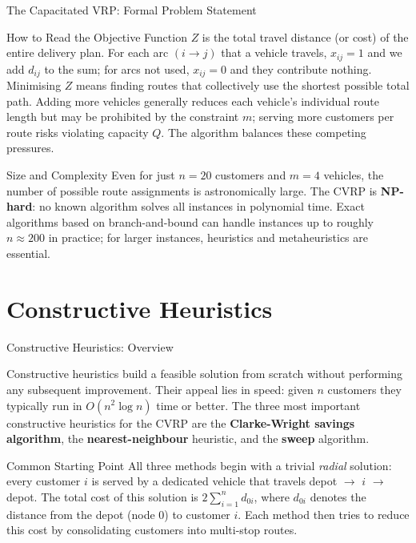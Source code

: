 \documentclass[aspectratio=169,10pt]{beamer}
\begin{document}
\begin{frame}[allowframebreaks]{The Capacitated VRP: Formal Problem Statement}
  \begin{alertblock}{How to Read the Objective Function}
    $Z$ is the total travel distance (or cost) of the entire delivery
    plan.  For each arc $(i \to j)$ that a vehicle travels, $x_{ij} = 1$
    and we add $d_{ij}$ to the sum; for arcs not used, $x_{ij} = 0$ and
    they contribute nothing.  Minimising $Z$ means finding routes that
    collectively use the shortest possible total path.  Adding more
    vehicles generally reduces each vehicle's individual route length but
    may be prohibited by the constraint $m$; serving more customers per
    route risks violating capacity $Q$.  The algorithm balances these
    competing pressures.
  \end{alertblock}

  \begin{exampleblock}{Size and Complexity}
    Even for just $n = 20$ customers and $m = 4$ vehicles, the number of
    possible route assignments is astronomically large.  The CVRP is
    \textbf{NP-hard}: no known algorithm solves all instances in polynomial
    time.  Exact algorithms based on branch-and-bound can handle instances
    up to roughly $n \approx 200$ in practice; for larger instances,
    heuristics and metaheuristics are essential.
  \end{exampleblock}

\end{frame}

\section{Constructive Heuristics}

\begin{frame}[allowframebreaks]{Constructive Heuristics: Overview}

  Constructive heuristics build a feasible solution from scratch without
  performing any subsequent improvement.  Their appeal lies in speed:
  given $n$ customers they typically run in $O(n^2 \log n)$ time or
  better.  The three most important constructive heuristics for the CVRP
  are the \textbf{Clarke-Wright savings algorithm}, the
  \textbf{nearest-neighbour} heuristic, and the \textbf{sweep} algorithm.

  \begin{block}{Common Starting Point}
    All three methods begin with a trivial \emph{radial} solution: every
    customer $i$ is served by a dedicated vehicle that travels
    depot $\to$ $i$ $\to$ depot.  The total cost of this solution is
    $2\sum_{i=1}^{n} d_{0i}$, where $d_{0i}$ denotes the distance from
    the depot (node $0$) to customer $i$.  Each method then tries to
    reduce this cost by consolidating customers into multi-stop routes.
  \end{block}

\end{frame}
\end{document}

